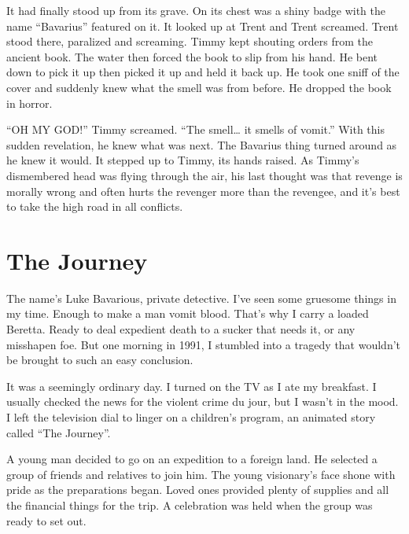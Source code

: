 It had finally stood up from its grave. On its chest was a shiny
badge with the name ``Bavarius'' featured on it. It looked up at
Trent and Trent screamed. Trent stood there, paralized and
screaming. Timmy kept shouting orders from the ancient book. The
water then forced the book to slip from his hand. He bent down to
pick it up then picked it up and held it back up. He took one sniff
of the cover and suddenly knew what the smell was from before. He
dropped the book in horror.



``OH MY GOD!'' Timmy screamed. ``The smell{\ldots} it smells of vomit.''
With this sudden revelation, he knew what was next. The Bavarius
thing turned around as he knew it would. It stepped up to Timmy,
its hands raised. As Timmy's dismembered head was flying
through the air, his last thought was that revenge is morally wrong
and often hurts the revenger more than the revengee, and it's best
to take the high road in all conflicts. 

 





\chapter{The Journey}



The name's Luke Bavarious, private detective. I've seen
some gruesome things in my time. Enough to make a man vomit blood.
That's why I carry a loaded Beretta. Ready to deal expedient
death to a sucker that needs it, or any misshapen foe. But one
morning in 1991, I stumbled into a tragedy that wouldn't be
brought to such an easy conclusion.



It was a seemingly ordinary day. I turned on the TV as I ate my
breakfast. I usually checked the news for the violent crime du
jour, but I wasn't in the mood. I left the television dial to
linger on a children's program, an animated story called
``The Journey''.



A young man decided to go on an expedition to a foreign land. He
selected a group of friends and relatives to join him. The young
visionary's face shone with pride as the preparations began.
Loved ones provided plenty of supplies and all the financial things
for the trip. A celebration was held when the group was ready to
set out.



